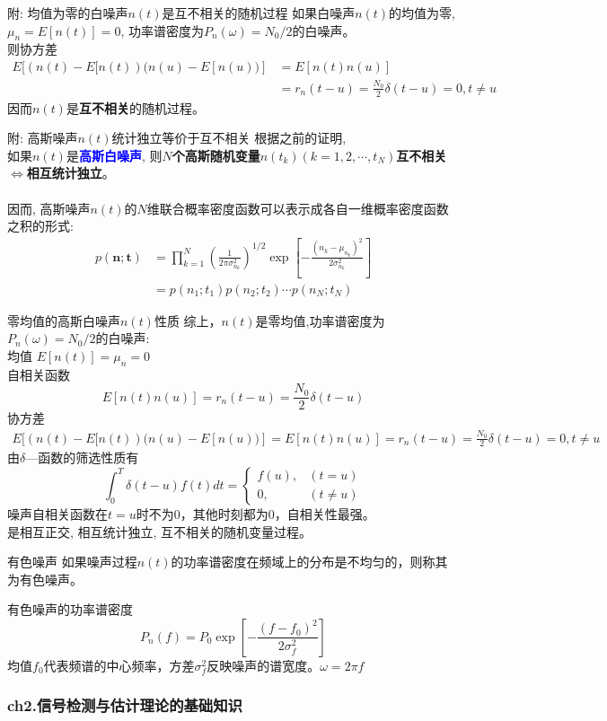\begin{frame}[shrink]{附: 均值为零的白噪声$n(t)$是互不相关的随机过程}
如果白噪声$n(t)$的均值为零, $\mu_n=E[n(t)]=0$, 功率谱密度为$P_n(\omega)=N_0/2$的白噪声。\\ 
则协方差
\begin{align*}
E[(n(t)-E[n(t))(n(u)-E[n(u))]&=E[n(t)n(u)]\\
&=r_n(t-u)=\frac{N_0}{2}\delta(t-u)=0, t\ne u
\end{align*}
因而$n(t)$是\textbf{互不相关}的随机过程。\\
\end{frame}

\begin{frame}[shrink]{附: 高斯噪声$n(t)$统计独立等价于互不相关}
根据之前的证明,\\
如果$n(t)$是\textbf{\textcolor{blue}{高斯白噪声}}, 则\textbf{$N$个高斯随机变量$n(t_k) (k=1,2,\cdots,t_N)$互不相关$\Leftrightarrow$相互统计独立}。\\
~\\
因而, 高斯噪声$n(t)$的$N$维联合概率密度函数可以表示成各自一维概率密度函数之积的形式:
\begin{align*}
p(\bm{n;t})&=\prod\limits_{k=1}^{N}\left(\frac{1}{2\pi\sigma_{n_k}^2}\right)^{1/2}\exp\left[-\frac{(n_k-\mu_{n_k})^2}{2\sigma_{n_k}^2}\right]\\
&=p(n_1;t_1)p(n_2;t_2)\cdots p(n_N;t_N)
\end{align*}
\end{frame}

\begin{frame}[shrink]{零均值的高斯白噪声$n(t)$性质}
综上，$n(t)$是零均值,功率谱密度为$P_n(\omega)=N_0/2$的白噪声:\\
均值 $E[n(t)]=\mu_n=0$\\
自相关函数 
\[ E[n(t)n(u)]=r_n(t-u)=\frac{N_0}{2}\delta(t-u)\]
协方差
\begin{align*}
E[(n(t)-E[n(t))(n(u)-E[n(u))]=E[n(t)n(u)]=r_n(t-u)=\frac{N_0}{2}\delta(t-u)=0, t\ne u
\end{align*}
由$\delta$---函数的筛选性质有
\[
\int_0^T\delta(t-u)f(t)dt=
\begin{cases}
f(u), & (t=u)\\
0, & (t\ne u) 
\end{cases}
\]
噪声自相关函数在$t=u$时不为0，其他时刻都为0，自相关性最强。\\
是相互正交, 相互统计独立, 互不相关的随机变量过程。
\end{frame}

\begin{frame}{有色噪声}
如果噪声过程$n(t)$的功率谱密度在频域上的分布是不均匀的，则称其为有色噪声。
\begin{block}{有色噪声的功率谱密度}
	\[P_n(f) =P_0\exp\left[-\frac{(f-f_0)^2}{2\sigma_f^2}\right]\]
	均值$f_0$代表频谱的中心频率，方差$\sigma_f^2$反映噪声的谱宽度。$\omega=2\pi f$
\end{block}
\end{frame}

\begin{frame}[shrink]
\frametitle{ch2.信号检测与估计理论的基础知识}
\tableofcontents[hideallsubsections]
\end{frame}


